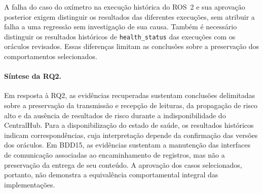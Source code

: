 A falha do caso do oxímetro na execução histórica do ROS~2 e sua aprovação posterior exigem distinguir os resultados das diferentes execuções, sem atribuir a falha a uma regressão sem investigação de sua causa. Também é necessário distinguir os resultados históricos de \texttt{health\_status} das execuções com os oráculos revisados. Essas diferenças limitam as conclusões sobre a preservação dos comportamentos selecionados.

\paragraph{Síntese da RQ2.}

Em resposta à RQ2, as evidências recuperadas sustentam conclusões delimitadas sobre a preservação da transmissão e recepção de leituras, da propagação de risco alto e da ausência de resultados de risco durante a indisponibilidade do CentralHub. Para a disponibilização do estado de saúde, os resultados históricos indicam correspondências, cuja interpretação depende da confirmação das versões dos oráculos. Em BDD15, as evidências sustentam a manutenção das interfaces de comunicação associadas ao encaminhamento de registros, mas não a preservação da entrega de seu conteúdo. A aprovação dos casos selecionados, portanto, não demonstra a equivalência comportamental integral das implementações.

